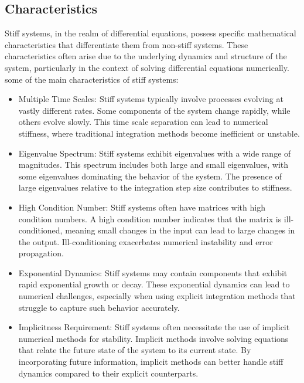 \documentclass[a4paper, twoside]{report} %
\begin{document}
	\subsection{Characteristics}
	Stiff systems, in the realm of differential equations, possess specific mathematical characteristics that differentiate them from non-stiff systems. These characteristics often arise due to the underlying dynamics and structure of the system, particularly in the context of solving differential equations numerically. some of the main characteristics of stiff systems:

	\begin{itemize}
		\item Multiple Time Scales: Stiff systems typically involve processes evolving at vastly different rates. Some components of the system change rapidly, while others evolve slowly. This time scale separation can lead to numerical stiffness, where traditional integration methods become inefficient or unstable.

		\item Eigenvalue Spectrum: Stiff systems exhibit eigenvalues with a wide range of magnitudes. This spectrum includes both large and small eigenvalues, with some eigenvalues dominating the behavior of the system. The presence of large eigenvalues relative to the integration step size contributes to stiffness.

		\item High Condition Number: Stiff systems often have matrices with high condition numbers. A high condition number indicates that the matrix is ill-conditioned, meaning small changes in the input can lead to large changes in the output. Ill-conditioning exacerbates numerical instability and error propagation.

		\item Exponential Dynamics: Stiff systems may contain components that exhibit rapid exponential growth or decay. These exponential dynamics can lead to numerical challenges, especially when using explicit integration methods that struggle to capture such behavior accurately.

		\item Implicitness Requirement: Stiff systems often necessitate the use of implicit numerical methods for stability. Implicit methods involve solving equations that relate the future state of the system to its current state. By incorporating future information, implicit methods can better handle stiff dynamics compared to their explicit counterparts.


\end{itemize}
\end{document}

